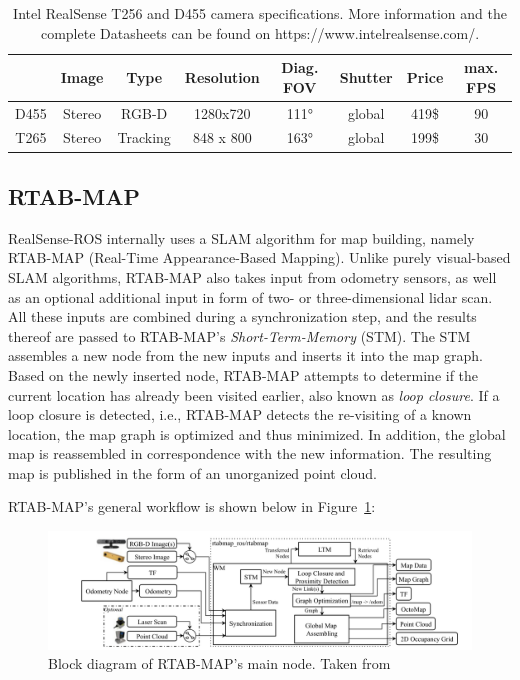 \documentclass[main.tex]{subfiles}
\begin{document}
\begin{table}[H]
    \centering
    \begin{tabular}{c|ccccccc}
             & Image  & Type     & Resolution & Diag. FOV & Shutter& Price & max. FPS \\ \hline
        D455 & Stereo & RGB-D    & 1280x720   & 111°      & global & 419\$ & 90       \\ \hline
        T265 & Stereo & Tracking & 848 x 800  & 163°      & global & 199\$ & 30
    \end{tabular}
    \caption[Intel RealSense T256 & D455 Specification]{Intel RealSense T256 and D455 camera specifications. More information and the complete Datasheets can be found on https://www.intelrealsense.com/.}
    \label{tab:cameraspecs}
\end{table}


\subsection*{RTAB-MAP}
RealSense-ROS internally uses a SLAM algorithm for map building, namely RTAB-MAP (Real-Time Appearance-Based Mapping)\cite{Labbé_Michaud_2019}.
Unlike purely visual-based SLAM algorithms, RTAB-MAP also takes input from odometry sensors, as well as an optional additional input in form of two- or three-dimensional
lidar scan.
All these inputs are combined during a synchronization step, and the results thereof are passed to RTAB-MAP's \textit{Short-Term-Memory} (STM).
The STM assembles a new node from the new inputs and inserts it into the map graph. Based on the newly inserted node, RTAB-MAP attempts to determine if the current location has already been visited earlier, also known as \textit{loop closure}.
If a loop closure is detected, i.e., RTAB-MAP detects the re-visiting of a known location, the map graph is optimized and thus minimized. In addition, the global map is reassembled in correspondence with the new information.
The resulting map is published in the form of an unorganized point cloud.

RTAB-MAP's general workflow is shown below in Figure~\ref{fig:rtabmap}:
\begin{figure}[!h]
    \centering
    \includegraphics[width=15 cm]{images/rtabmap.png}
    \caption[RTAB-MAP Block Diagram]{Block diagram of RTAB-MAP's main node. Taken from \cite[Figure~1]{Labbé_Michaud_2019}}
    \label{fig:rtabmap}
\end{figure}
\end{document}
